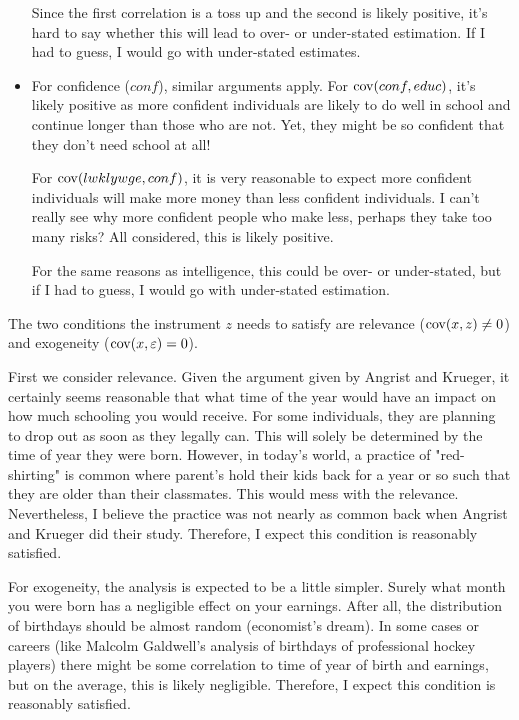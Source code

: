 \documentclass[12pt,twoside]{article}
\begin{document}
\begin{problems}
\begin{problemparts}
\begin{itemize}
    Since the first correlation is a toss up and the second is likely
    positive, it's hard to say whether this will lead to over- or
    under-stated estimation. If I had to guess, I would go with
    under-stated estimates.

    \item For confidence ($conf$), similar arguments apply. For $\operatorname{cov}(conf,
    educ)$, it's likely positive as more confident individuals are likely to
    do well in school and continue longer than those who are not. Yet, they
    might be so confident that they don't need school at all!

    For $\operatorname{cov}(lwklywge, conf)$, it is very reasonable to expect more
    confident individuals will make more money than less confident
    individuals. I can't really see why more confident people who make less,
    perhaps they take too many risks? All considered, this is likely
    positive.

    For the same reasons as intelligence, this could be over- or
    under-stated, but if I had to guess, I would go with under-stated
    estimation.

\end{itemize}

\problempart %

The two conditions the instrument $z$ needs to satisfy are relevance ($\operatorname{cov}(x,
z) \neq 0$) and exogeneity ($\operatorname{cov}(x, \varepsilon) = 0$).

First we consider relevance. Given the argument given by Angrist and Krueger,
it certainly seems reasonable that what time of the year would have an impact
on how much schooling you would receive. For some individuals, they are
planning to drop out as soon as they legally can. This will solely be
determined by the time of year they were born. However, in today's world, a
practice of "red-shirting" is common where parent's hold their kids back for
a year or so such that they are older than their classmates. This would mess
with the relevance. Nevertheless, I believe the practice was not nearly as
common back when Angrist and Krueger did their study. Therefore, I expect
this condition is reasonably satisfied.

For exogeneity, the analysis is expected to be a little simpler. Surely what
month you were born has a negligible effect on your earnings. After all, the
distribution of birthdays should be almost random (economist's dream). In
some cases or careers (like Malcolm Galdwell's analysis of birthdays of
professional hockey players) there might be some correlation to time of year
of birth and earnings, but on the average, this is likely negligible.
Therefore, I expect this condition is reasonably satisfied.


\end{problemparts}
\end{problems}
\end{document}
